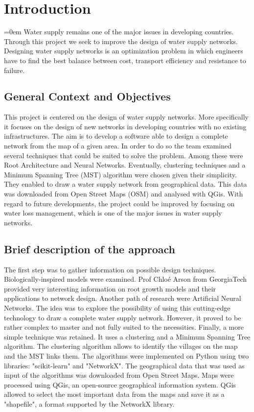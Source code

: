 \chapter{Introduction}
\label{Introduzione}
\thispagestyle{empty}






\parindent=0em
Water supply remains one of the major issues in developing countries. Through this
project we seek to improve the design of water supply networks. Designing water supply
networks is an optimization problem in which engineers have to find the best balance
between cost, transport efficiency and resistance to failure.

\section{General Context and Objectives}
This project is centered on the design of water supply networks. More specifically it focuses on the design of new 
networks in developing countries with no existing infrastructures.
The aim is to develop a software able to design a complete network from the map of a given area.
In order to do so the team examined several techniques that could be suited to solve the problem.
Among these were Root Architecture and Neural Networks. Eventually, clustering techniques and a Minimum
Spanning Tree (MST) algorithm were chosen given their simplicity. They enabled to draw a water supply network 
from geographical data. This data was downloaded from Open Street Maps (OSM) and analysed with QGis.
With regard to future developments, the project could be improved by focusing on water loss management,
which is one of the major issues in water supply networks.

\section{Brief description of the approach}
The first step was to gather information on possible design techniques. Biologically-inspired models were
examined. Prof Chloé Arson from GeorgiaTech 
provided very interesting information on root growth models and their applications to network design.
Another path of research were Artificial Neural Networks. The idea was to explore the possibility of using
this cutting-edge technology to draw a complete water supply network. However, it proved to be rather complex
to master and not fully suited to the necessities.
Finally, a more simple technique was retained. It uses a clustering and a Minimum Spanning Tree algorithm.
The clustering algorithm allows to identify the villages on the map and the MST links them.
The algorithms were implemented on Python using two libraries: "scikit-learn" and "NetworkX".
The geographical data that was used as input of the algorithms was downloaded from Open Street Maps. 
Maps were processed using 
QGis, an open-source geographical information system. QGis allowed to select the most important 
data from the maps
and save it as a "shapefile", a format supported by the NetworkX library.

